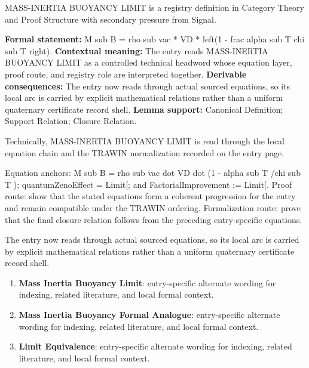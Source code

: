 
\begingroup\small
{}
MASS-INERTIA BUOYANCY LIMIT is a registry definition in Category Theory and Proof Structure with secondary pressure from Signal.

\begingroup\footnotesize\setlength{\emergencystretch}{3em}\sloppy
\textbf{Formal statement:} M sub B = rho sub vac * VD * left(1 - frac alpha sub T chi sub T right). \textbf{Contextual meaning:} The entry reads MASS-INERTIA BUOYANCY LIMIT as a controlled technical headword whose equation layer, proof route, and registry role are interpreted together. \textbf{Derivable consequences:} The entry now reads through actual sourced equations, so its local arc is carried by explicit mathematical relations rather than a uniform quaternary certificate record shell. \textbf{Lemma support:} Canonical Definition; Support Relation; Closure Relation.\par
\endgroup

Technically, MASS-INERTIA BUOYANCY LIMIT is read through the local equation chain and the TRAWIN normalization recorded on the entry page.

Equation anchors: M sub B = rho sub vac dot VD dot (1 - alpha sub T /chi sub T ); quantumZenoEffect = Limit[; and FactorialImprovement := Limit[. Proof route: show that the stated equations form a coherent progression for the entry and remain compatible under the TRAWIN ordering. Formalization route: prove that the final closure relation follows from the preceding entry-specific equations.

The entry now reads through actual sourced equations, so its local arc is carried by explicit mathematical relations rather than a uniform quaternary certificate record shell.
\endgroup

\begin{enumerate}[leftmargin=1.6em,itemsep=6pt,topsep=4pt]
\item \textbf{Mass Inertia Buoyancy Limit}: entry-specific alternate wording for indexing, related literature, and local formal context.
\item \textbf{Mass Inertia Buoyancy Formal Analogue}: entry-specific alternate wording for indexing, related literature, and local formal context.
\item \textbf{Limit Equivalence}: entry-specific alternate wording for indexing, related literature, and local formal context.
\end{enumerate}

